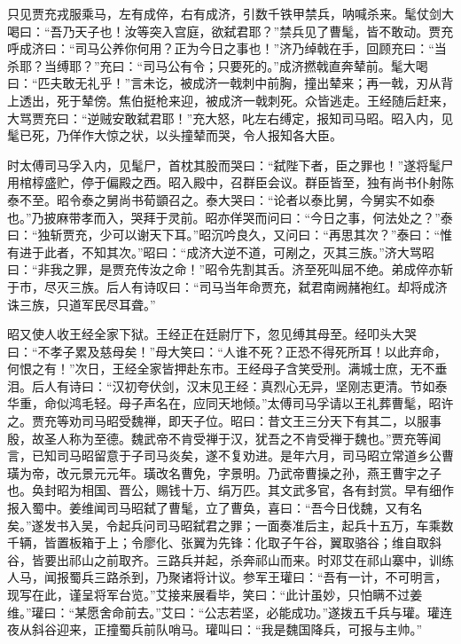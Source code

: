 只见贾充戎服乘马，左有成倅，右有成济，引数千铁甲禁兵，呐喊杀来。髦仗剑大喝曰：“吾乃天子也！汝等突入宫庭，欲弑君耶？”禁兵见了曹髦，皆不敢动。贾充呼成济曰：“司马公养你何用？正为今日之事也！”济乃绰戟在手，回顾充曰：“当杀耶？当缚耶？”充曰：“司马公有令；只要死的。”成济撚戟直奔辇前。髦大喝曰：“匹夫敢无礼乎！”言未讫，被成济一戟刺中前胸，撞出辇来；再一戟，刃从背上透出，死于辇傍。焦伯挺枪来迎，被成济一戟刺死。众皆逃走。王经随后赶来，大骂贾充曰：“逆贼安敢弑君耶！”充大怒，叱左右缚定，报知司马昭。昭入内，见髦已死，乃佯作大惊之状，以头撞辇而哭，令人报知各大臣。

时太傅司马孚入内，见髦尸，首枕其股而哭曰：“弑陛下者，臣之罪也！”遂将髦尸用棺椁盛贮，停于偏殿之西。昭入殿中，召群臣会议。群臣皆至，独有尚书仆射陈泰不至。昭令泰之舅尚书荀顗召之。泰大哭曰：“论者以泰比舅，今舅实不如泰也。”乃披麻带孝而入，哭拜于灵前。昭亦佯哭而问曰：“今日之事，何法处之？”泰曰：“独斩贾充，少可以谢天下耳。”昭沉吟良久，又问曰：“再思其次？”泰曰：“惟有进于此者，不知其次。”昭曰：“成济大逆不道，可剐之，灭其三族。”济大骂昭曰：“非我之罪，是贾充传汝之命！”昭令先割其舌。济至死叫屈不绝。弟成倅亦斩于市，尽灭三族。后人有诗叹曰：“司马当年命贾充，弑君南阙赭袍红。却将成济诛三族，只道军民尽耳聋。”

昭又使人收王经全家下狱。王经正在廷尉厅下，忽见缚其母至。经叩头大哭曰：“不孝子累及慈母矣！”母大笑曰：“人谁不死？正恐不得死所耳！以此弃命，何恨之有！”次日，王经全家皆押赴东市。王经母子含笑受刑。满城士庶，无不垂泪。后人有诗曰：“汉初夸伏剑，汉末见王经：真烈心无异，坚刚志更清。节如泰华重，命似鸿毛轻。母子声名在，应同天地倾。”太傅司马孚请以王礼葬曹髦，昭许之。贾充等劝司马昭受魏禅，即天子位。昭曰：昔文王三分天下有其二，以服事殷，故圣人称为至德。魏武帝不肯受禅于汉，犹吾之不肯受禅于魏也。”贾充等闻言，已知司马昭留意于子司马炎矣，遂不复劝进。是年六月，司马昭立常道乡公曹璜为帝，改元景元元年。璜改名曹免，字景明。乃武帝曹操之孙，燕王曹宇之子也。奂封昭为相国、晋公，赐钱十万、绢万匹。其文武多官，各有封赏。早有细作报入蜀中。姜维闻司马昭弑了曹髦，立了曹奂，喜曰：“吾今日伐魏，又有名矣。”遂发书入吴，令起兵问司马昭弑君之罪；一面奏准后主，起兵十五万，车乘数千辆，皆置板箱于上；令廖化、张翼为先锋：化取子午谷，翼取骆谷；维自取斜谷，皆要出祁山之前取齐。三路兵并起，杀奔祁山而来。时邓艾在祁山寨中，训练人马，闻报蜀兵三路杀到，乃聚诸将计议。参军王瓘曰：“吾有一计，不可明言，现写在此，谨呈将军台览。”艾接来展看毕，笑曰：“此计虽妙，只怕瞒不过姜维。”瓘曰：“某愿舍命前去。”艾曰：“公志若坚，必能成功。”遂拨五千兵与瓘。瓘连夜从斜谷迎来，正撞蜀兵前队哨马。瓘叫曰：“我是魏国降兵，可报与主帅。”

